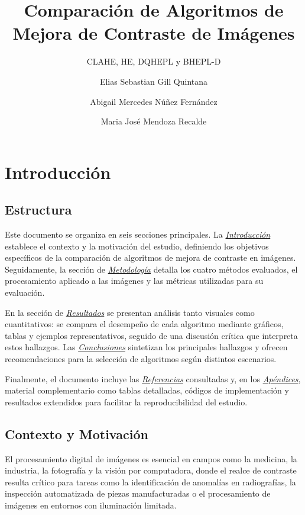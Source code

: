 \documentclass[sigchi]{acmart}
\title{Comparación de Algoritmos de Mejora de Contraste de Imágenes}
\subtitle{CLAHE, HE, DQHEPL y BHEPL-D}
\author{Elias Sebastian Gill Quintana}
\affiliation{
    \institution{Facultad Politecnica - UNA}
    \city{San Lorenzo}
    \country{Paraguay}
}
\author{Abigail Mercedes Núñez Fernández}
\affiliation{
    \institution{Facultad Politecnica - UNA}
    \city{San Lorenzo}
    \country{Paraguay}
}
\author{Maria José Mendoza Recalde}
\affiliation{
    \institution{Facultad Politecnica - UNA}
    \city{San Lorenzo}
    \country{Paraguay}
}
\begin{document}
\maketitle

\section{Introducción}

\subsection{Estructura}
\label{subsec:estructura}

Este documento se organiza en seis secciones principales. La
\emph{\hyperref[sec:contexto]{Introducción}} establece el contexto y la motivación del
estudio, definiendo los objetivos específicos de la comparación de algoritmos de mejora de
contraste en imágenes. Seguidamente, la sección de
\emph{\hyperref[sec:metodologia]{Metodología}} detalla los cuatro métodos evaluados, el
procesamiento aplicado a las imágenes y las métricas utilizadas para su evaluación.

En la sección de \emph{\hyperref[sec:resultados]{Resultados}} se presentan análisis tanto
visuales como cuantitativos: se compara el desempeño de cada algoritmo mediante gráficos,
tablas y ejemplos representativos, seguido de una discusión crítica que interpreta estos
hallazgos. Las \emph{\hyperref[sec:conclusiones]{Conclusiones}} sintetizan los principales
hallazgos y ofrecen recomendaciones para la selección de algoritmos según distintos escenarios.

Finalmente, el documento incluye las \emph{\hyperref[sec:bibliography]{Referencias}} consultadas
y, en los \emph{\hyperref[sec:apendices]{Apéndices}}, material complementario como tablas
detalladas, códigos de implementación y resultados extendidos para facilitar la
reproducibilidad del estudio.

\subsection{Contexto y Motivación}
\label{subsec:contexto}

El procesamiento digital de imágenes es esencial en campos como la medicina, la industria, la
fotografía y la visión por computadora, donde el realce de contraste resulta crítico para
tareas como la identificación de anomalías en radiografías, la inspección automatizada de
piezas manufacturadas o el procesamiento de imágenes en entornos con iluminación limitada.
\end{document}
